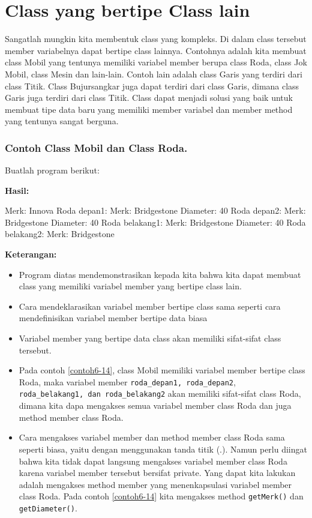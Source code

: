 \section{Class yang bertipe Class
lain}\label{class-yang-bertipe-class-lain}

Sangatlah mungkin kita membentuk class yang kompleks. Di dalam class
tersebut member variabelnya dapat bertipe class lainnya. Contohnya
adalah kita membuat class Mobil yang tentunya memiliki variabel member
berupa class Roda, class Jok Mobil, class Mesin dan lain-lain. Contoh
lain adalah class Garis yang terdiri dari class Titik. Class
Bujursangkar juga dapat terdiri dari class Garis, dimana class Garis
juga terdiri dari class Titik. Class dapat menjadi solusi yang baik
untuk membuat tipe data baru yang memiliki member variabel dan member
method yang tentunya sangat berguna.

\subsubsection*{Contoh Class Mobil dan Class Roda.}

Buatlah program berikut:



\textbf{Hasil:}

\begin{lcverbatim}
Merk: Innova
Roda depan1:
Merk: Bridgestone
Diameter: 40
Roda depan2:
Merk: Bridgestone
Diameter: 40
Roda belakang1:
Merk: Bridgestone
Diameter: 40
Roda belakang2:
Merk: Bridgestone
\end{lcverbatim}

\textbf{Keterangan:}

\begin{itemize}

\item
 Program diatas mendemonstrasikan kepada kita bahwa kita dapat membuat
 class yang memiliki variabel member yang bertipe class lain.
\item
 Cara mendeklarasikan variabel member bertipe class sama seperti cara
 mendefinisikan variabel member bertipe data biasa
\item
 Variabel member yang bertipe data class akan memiliki sifat-sifat
 class tersebut.
\item
 Pada contoh \ref{contoh6-14}, class Mobil memiliki variabel member
 bertipe class Roda, maka variabel member
 \texttt{roda\_depan1,\ roda\_depan2},
 \texttt{roda\_belakang1,\ dan\ roda\_belakang2} akan memiliki
 sifat-sifat class Roda, dimana kita dapa mengakses semua variabel
 member class Roda dan juga method member class Roda.
\item
 Cara mengakses variabel member dan method member class Roda sama
 seperti biasa, yaitu dengan menggunakan tanda titik (.). Namun perlu
 diingat bahwa kita tidak dapat langsung mengakses variabel member
 class Roda karena variabel member tersebut bersifat private. Yang
 dapat kita lakukan adalah mengakses method member yang menenkapsulasi
 variabel member class Roda. Pada contoh \ref{contoh6-14} kita mengakses method
 \texttt{getMerk()} dan \texttt{getDiameter()}.
\end{itemize}

